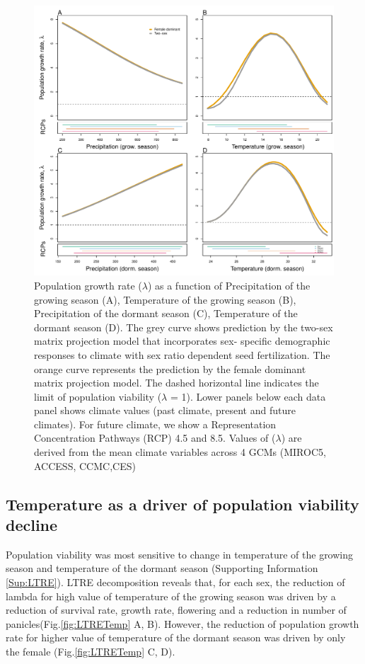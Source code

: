 \documentclass[12pt]{article}
\begin{document}
\begin{figure}[H]
  \begin{center}
    \includegraphics[width=0.95\linewidth]{Figures/lambda_past_present_future.pdf}
  \caption{Population growth rate ($\lambda$) as a function of Precipitation of the growing season (A), Temperature of the growing season (B), Precipitation of the dormant season (C), Temperature of the dormant season (D).
The grey curve shows prediction by the two-sex matrix projection model that incorporates sex- specific demographic responses to climate with sex ratio dependent seed fertilization.
The orange curve represents the prediction by the female dominant matrix projection model.
The dashed horizontal line indicates the limit of population viability ($\lambda$ = 1).
Lower panels below each data panel shows climate values (past climate, present and future climates).
For future climate, we show a Representation Concentration Pathways (RCP) 4.5 and 8.5. Values of ($\lambda$) are derived from the mean climate variables across 4 GCMs (MIROC5, ACCESS, CCMC,CES)}
  \label{fig:lambda}
  \end{center}
\end{figure}

\subsection*{Temperature as a driver of population viability decline }
Population viability was most sensitive to change in temperature of the growing season and temperature of the dormant season (Supporting Information \ref{Sup:LTRE}). 
LTRE decomposition reveals that, for each sex, the reduction of lambda for high value of temperature of the growing season was driven by a reduction of survival rate, growth rate, flowering and a reduction in number of panicles(Fig.\ref{fig:LTRETemp} A, B). 
However, the reduction of population growth rate for higher value of temperature of the dormant season was driven by only the female (Fig.\ref{fig:LTRETemp} C, D). 
\end{document}

